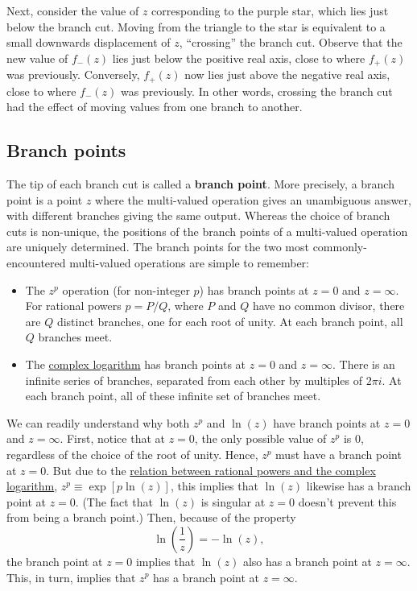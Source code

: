 \documentclass[10pt,a4paper]{article}
\begin{document}
Next, consider the value of $z$ corresponding to the purple star,
which lies just below the branch cut.  Moving from the triangle to the
star is equivalent to a small downwards displacement of $z$,
``crossing'' the branch cut.  Observe that the new value of $f_-(z)$
lies just below the positive real axis, close to where $f_+(z)$ was
previously. Conversely, $f_+(z)$ now lies just above the negative real
axis, close to where $f_-(z)$ was previously.  In other words,
crossing the branch cut had the effect of moving values from one
branch to another.

\subsection{Branch points}
\label{branch-points}

The tip of each branch cut is called a \textbf{branch point}. More
precisely, a branch point is a point $z$ where the multi-valued
operation gives an unambiguous answer, with different branches giving
the same output. Whereas the choice of branch cuts is non-unique, the
positions of the branch points of a multi-valued operation are
uniquely determined. The branch points for the two most
commonly-encountered multi-valued operations are simple to remember:
\begin{itemize}
\item
  The $z^p$ operation (for non-integer $p$) has branch points at
  $z = 0$ and $z = \infty$. For rational powers $p = P/Q$, where
  $P$ and $Q$ have no common divisor, there are $Q$ distinct
  branches, one for each root of unity. At each branch point, all $Q$
  branches meet.
\item
  The \hyperref[complex-logarithms]{complex logarithm} has branch
  points at $z = 0$ and $z = \infty$. There is an infinite series of
  branches, separated from each other by multiples of $2 \pi i$. At
  each branch point, all of these infinite set of branches meet.
\end{itemize}

We can readily understand why both $z^p$ and $\ln(z)$ have branch
points at $z = 0$ and $z = \infty$. First, notice that at $z = 0$, the
only possible value of $z^p$ is $0$, regardless of the choice of the
root of unity. Hence, $z^p$ must have a branch point at $z = 0$.  But
due to the \hyperref[complex-logarithms]{relation between rational
  powers and the complex logarithm}, $z^p \equiv \exp[p\ln(z)]$, this
implies that $\ln(z)$ likewise has a branch point at $z = 0$. (The
fact that $\ln(z)$ is singular at $z = 0$ doesn't prevent this from
being a branch point.) Then, because of the property
\begin{equation}
\ln\left(\frac{1}{z}\right) = -\ln(z),
\end{equation}
the branch point at $z = 0$ implies that $\ln(z)$ also has a branch
point at $z = \infty$. This, in turn, implies that $z^p$ has a
branch point at $z = \infty$.
\end{document}
